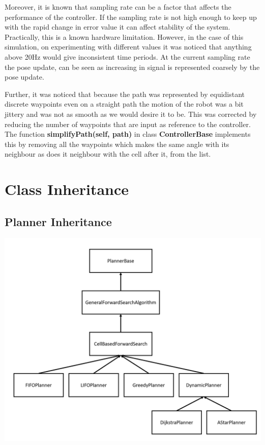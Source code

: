 \documentclass[a4paper,12pt]{article}
\begin{document}
		Moreover, it is known that sampling rate can be a factor that affects the performance of the controller. If the sampling rate is not high enough to keep up with the rapid change in error value it can affect stability of the system. Practically, this is a known hardware limitation. However, in the case of this simulation, on experimenting with different values it was noticed that anything above 20Hz would give inconsistent time periods. At the current sampling rate the pose update, can be seen as increasing in signal is represented coarsely by the pose update. 
		
		Further, it was noticed that because the path was represented by equidistant discrete waypoints even on a straight path the motion of the robot was a bit jittery and was not as smooth as we would desire it to be. This was corrected by reducing the number of waypoints that are input as reference to the controller. The function \textbf{simplifyPath(self, path)} in class \textbf{ControllerBase} implements this by removing all the waypoints which makes the same angle with its neighbour as does it neighbour with the cell after it, from the list.
	
	
	\newpage
	
	\appendix
	\appendixpage
	\addappheadtotoc
	\section{Class Inheritance}
	\subsection{Planner Inheritance}
	\label{appendix:planner}
	\includegraphics[scale=0.6]{images/planner_inheritance.png}
\end{document}
